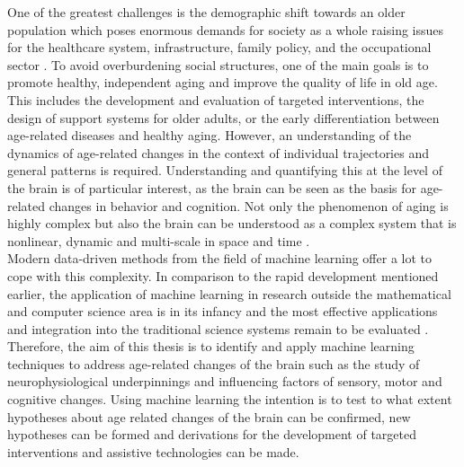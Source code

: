 One of the greatest challenges is the demographic shift towards an older population which poses enormous demands for society as a whole raising issues for the healthcare system, infrastructure, family policy, and the occupational sector \cite{who_aging2023}. To avoid overburdening social structures, one of the main goals is to promote healthy, independent aging and improve the quality of life in old age. This includes the development and evaluation of targeted interventions, the design of support systems for older adults, or the early differentiation between age-related diseases and healthy aging. However, an understanding of the dynamics of age-related changes in the context of individual trajectories and general patterns is required. Understanding and quantifying this at the level of the brain is of particular interest, as the brain can be seen as the basis for age-related changes in behavior and cognition. Not only the phenomenon of aging is highly complex but also the brain can be understood as a complex system that is nonlinear, dynamic and multi-scale in space and time \cite{}.\\ Modern data-driven methods from the field of machine learning offer a lot to cope with this complexity. In comparison to the rapid development mentioned earlier, the application of machine learning in research outside the mathematical and computer science area is in its infancy and the most effective applications and integration into the traditional science systems remain to be evaluated \cite{Bzdok2019}. Therefore, the aim of this thesis is to identify and apply machine learning techniques to address age-related changes of the brain such as the study of neurophysiological underpinnings and influencing factors of sensory, motor and cognitive changes. Using machine learning the intention is to test to what extent hypotheses about age related changes of the brain can be confirmed, new hypotheses can be formed and derivations for the development of targeted interventions and assistive technologies can be made.






